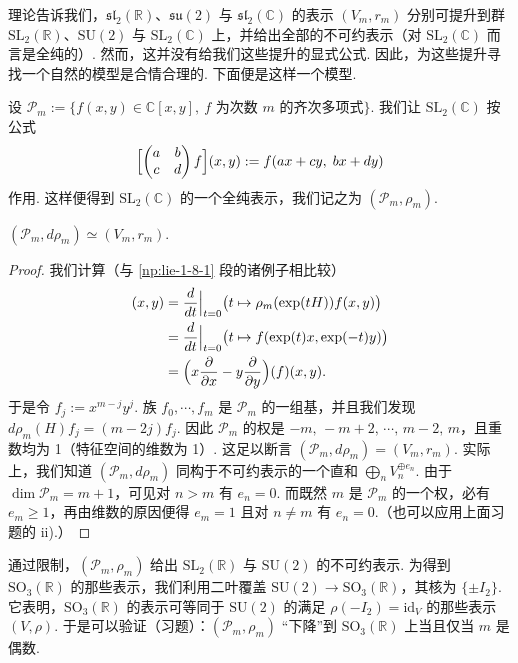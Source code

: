 \begin{numpara}\label{np:lie-1-13-3}
理论告诉我们，$\mathfrak{sl}_2(\mathbb R)$、$\mathfrak{su}(2)$ 与 $\mathfrak{sl}_2(\mathbb C)$ 的表示 $(V_m,r_m)$ 分别可提升到群 $\mathrm{SL}_2(\mathbb R)$、$\mathrm{SU}(2)$ 与 $\mathrm{SL}_2(\mathbb C)$ 上，并给出全部的不可约表示（对 $\mathrm{SL}_2(\mathbb C)$ 而言是全纯的）. 然而，这并没有给我们这些提升的显式公式. 因此，为这些提升寻找一个自然的模型是合情合理的. 下面便是这样一个模型.

设 $\mathcal{P}_m:=\{f(x,y)\in\mathbb C[x,y],\ f \text{ 为次数 } m \text{ 的齐次多项式}\}$. 我们让 $\mathrm{SL}_2(\mathbb C)$ 按公式
\[
\Bigl[\begin{pmatrix}a&b\\c&d\end{pmatrix}f\Bigr](x,y):=f(ax+cy,\; bx+dy)
\]
作用. 这样便得到 $\mathrm{SL}_2(\mathbb C)$ 的一个全纯表示，我们记之为 $(\mathcal{P}_m,\rho_m)$.
\end{numpara}

\begin{lemma*}
$(\mathcal{P}_m,d\rho_m)\simeq(V_m,r_m)$.
\end{lemma*}

\begin{proof}
我们计算（与 \ref{np:lie-1-8-1} 段的诸例子相比较）
\begin{align*}
[d\rho_m(H)f](x,y)&=\frac{d}{dt}\Big|_{t=0}\bigl(t\mapsto\rho_m(\exp(tH))f(x,y)\bigr)\\
&=\frac{d}{dt}\Big|_{t=0}\bigl(t\mapsto f(\exp(t)x,\exp(-t)y)\bigr)\\
&=\Bigl(x\frac{\partial}{\partial x}-y\frac{\partial}{\partial y}\Bigr)(f)(x,y).
\end{align*}
于是令 $f_j:=x^{m-j}y^j$. 族 $f_0,\cdots,f_m$ 是 $\mathcal{P}_m$ 的一组基，并且我们发现 $d\rho_m(H)f_j=(m-2j)f_j$. 因此 $\mathcal{P}_m$ 的权是 $-m,\,-m+2,\,\cdots,\,m-2,\,m$，且重数均为 1（特征空间的维数为 1）. 这足以断言 $(\mathcal{P}_m,d\rho_m)=(V_m,r_m)$. 实际上，我们知道 $(\mathcal{P}_m,d\rho_m)$ 同构于不可约表示的一个直和 $\bigoplus_n V_n^{\oplus e_n}$. 由于 $\dim\mathcal{P}_m=m+1$，可见对 $n>m$ 有 $e_n=0$. 而既然 $m$ 是 $\mathcal{P}_m$ 的一个权，必有 $e_m\geqslant 1$，再由维数的原因便得 $e_m=1$ 且对 $n\neq m$ 有 $e_n=0$.（也可以应用上面习题的 ii).）
\end{proof}

通过限制，$(\mathcal{P}_m,\rho_m)$ 给出 $\mathrm{SL}_2(\mathbb R)$ 与 $\mathrm{SU}(2)$ 的不可约表示. 为得到 $\mathrm{SO}_3(\mathbb R)$ 的那些表示，我们利用二叶覆盖 $\mathrm{SU}(2)\longrightarrow\mathrm{SO}_3(\mathbb R)$，其核为 $\{\pm I_2\}$. 它表明，$\mathrm{SO}_3(\mathbb R)$ 的表示可等同于 $\mathrm{SU}(2)$ 的满足 $\rho(-I_2)=\mathrm{id}_V$ 的那些表示 $(V,\rho)$. 于是可以验证（习题）：$(\mathcal{P}_m,\rho_m)$ ``下降''到 $\mathrm{SO}_3(\mathbb R)$ 上当且仅当 $m$ 是偶数.


